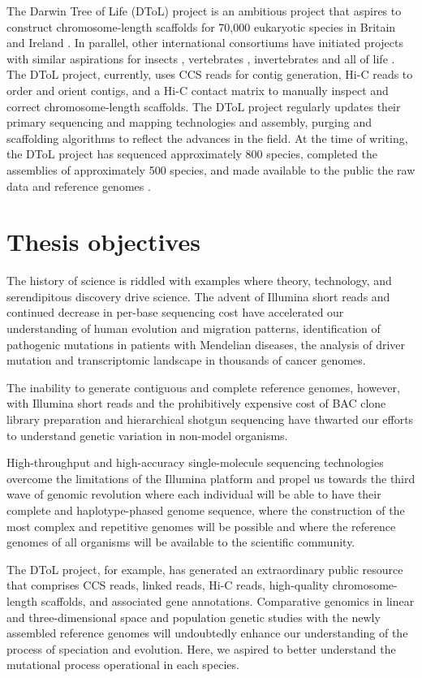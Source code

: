 The Darwin Tree of Life (DToL) project is an ambitious project that aspires to construct chromosome-length scaffolds for 70,000 eukaryotic species in Britain and Ireland \cite{}. In parallel, other international consortiums have initiated projects with similar aspirations for insects \cite{}, vertebrates \cite{}, invertebrates \cite{} and all of life \cite{}. The DToL project, currently, uses CCS reads for contig generation, Hi-C reads to order and orient contigs, and a Hi-C contact matrix to manually inspect and correct chromosome-length scaffolds. The DToL project regularly updates their primary sequencing and mapping technologies and assembly, purging and scaffolding algorithms to reflect the advances in the field. At the time of writing, the DToL project has sequenced approximately 800 species, completed the assemblies of approximately 500 species, and made available to the public the raw data and reference genomes \cite{}. 

\section{Thesis objectives}

The history of science is riddled with examples where theory, technology, and serendipitous discovery drive science. The advent of Illumina short reads and continued decrease in per-base sequencing cost have accelerated our understanding of human evolution and migration patterns\cite{}, identification of pathogenic mutations in patients with Mendelian diseases\cite{}, the analysis of driver mutation and transcriptomic landscape in thousands of cancer genomes\cite{}. 

The inability to generate contiguous and complete reference genomes, however, with Illumina short reads\cite{} and the prohibitively expensive cost of BAC clone library preparation and hierarchical shotgun sequencing have thwarted our efforts to understand genetic variation in non-model organisms\cite{}.

High-throughput and high-accuracy single-molecule sequencing technologies\cite{Wenger2019-pw} overcome the limitations of the Illumina platform and propel us towards the third wave of genomic revolution where each individual will be able to have their complete and haplotype-phased genome sequence, where the construction of the most complex and repetitive genomes will be possible and where the reference genomes of all organisms will be available to the scientific community. 

The DToL project, for example, has generated an extraordinary public resource that comprises CCS reads, linked reads, Hi-C reads, high-quality chromosome-length scaffolds, and associated gene annotations. Comparative genomics in linear and three-dimensional space and population genetic studies with the newly assembled reference genomes will undoubtedly enhance our understanding of the process of speciation and evolution. Here, we aspired to better understand the mutational process operational in each species.

